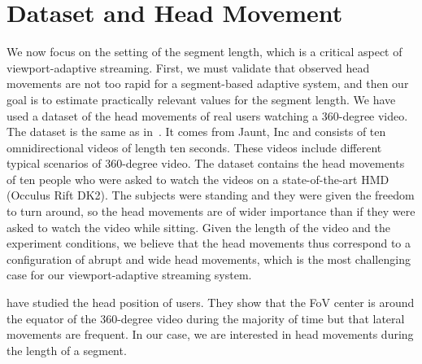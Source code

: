 \section{Dataset and Head Movement}
\label{sec:dataset}

We now focus on the setting of the segment length, which is a critical
aspect of viewport-adaptive streaming. First, we must validate that
observed head movements are not too rapid for a segment-based adaptive
system, and then our goal is to estimate practically relevant values
for the segment length. We have used a dataset of the head movements
of real users watching a 360-degree video. The dataset is the same as
in~\cite{yu_framework_2015}. It comes from Jaunt, Inc and consists of
ten omnidirectional videos of length ten seconds. These videos include
different typical scenarios of 360-degree video. The dataset contains
the head movements of ten people who were asked to watch the videos on
a state-of-the-art \ac{HMD} (Occulus Rift DK2). The subjects were
standing and they were given the freedom to turn around, so the head
movements are of wider importance than if they were asked to watch the
video while sitting. Given the length of the video and the experiment
conditions, we believe that the head movements thus correspond to a
configuration of abrupt and wide head movements, which is the most
challenging case for our viewport-adaptive streaming system.

\citet{yu_framework_2015} have studied the head position of users.
They show that the FoV center is around the equator of the 360-degree
video during the majority of time but that lateral movements are
frequent. In our case, we are interested in head movements during the
length of a segment.

